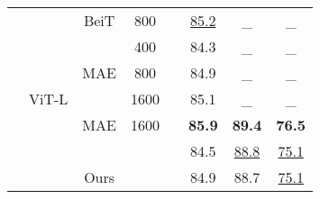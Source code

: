 \begin{table}[t]
{\begin{tabular}{c|c|ccc|ccc}
        & \multirow{7}{*}{ViT-L}
        & BeiT   & 800 &  & \underline{85.2}  & \_ & \_  \\
        \cmidrule{3-8}
      &  & \multirow{3}{*}{MAE} & 400 &  & 84.3  & \_ & \_ \\
       &  &  & 800 &  & 84.9  & \_ & \_ \\
      &  &  & 1600 &  & 85.1  & \_ & \_ \\
      \cmidrule{3-8}
      & & MAE   & 1600 &  & \textbf{85.9}  & \textbf{89.4} & \textbf{76.5} \\
        \cmidrule{3-8}
       & & \cellcolor{Goldenrod}   &  \cellcolor{Goldenrod}  & \cellcolor{Goldenrod}  & \cellcolor{Goldenrod} 84.5  & \cellcolor{Goldenrod} \underline{88.8} &  \cellcolor{Goldenrod} \underline{75.1}  \\  
       & & \multirow{-2}{*}{\cellcolor{Goldenrod} Ours}   & \cellcolor{Goldenrod}  & \cellcolor{Goldenrod}  & \cellcolor{Goldenrod} 84.9   & \cellcolor{Goldenrod} 88.7  &  \cellcolor{Goldenrod} \underline{75.1}    \\  
     \midrule
     

\end{tabular}}
\end{table}
